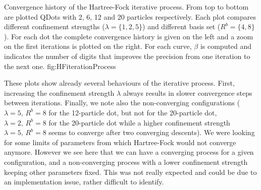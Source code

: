 {Convergence history of the Hartree-Fock iterative process. From top to bottom are plotted QDots with 2, 6, 12 and 20 particles respectively. Each plot compares different confinement strengths ($\lambda=\{1,2,5\}$) and different basis set ($R^b= \{ 4,8 \}$). For each dot the complete convergence history is given on the left and a zoom on the first iterations is plotted on the right. For each curve, $\beta$ is computed and indicates the number of digits that improves the precision from one iteration to the next one.}
{fig:HFiterationProcess}

These plots show already several behaviours of the iterative process. First, increasing 
the confinement strength $\lambda$ always results in slower convergence steps between iterations.%
Finally, we note also the non-converging configurations ($\lambda=5, \, R^b=8$ for the 12-particle dot, but not for the 20-particle dot, $\lambda=2, \, R^b=8$ for the 20-particle dot while a higher confinement strength $\lambda=5, \, R^b=8$ seems to converge after two converging descents). We were looking for some limits of parameters from which Hartree-Fock would not converge anymore. However we see here that we can have a converging process for a given configuration, and a non-converging process with a lower confinement strength keeping other parameters fixed. This was not really expected and could be due to an implementation issue, rather difficult to identify.


